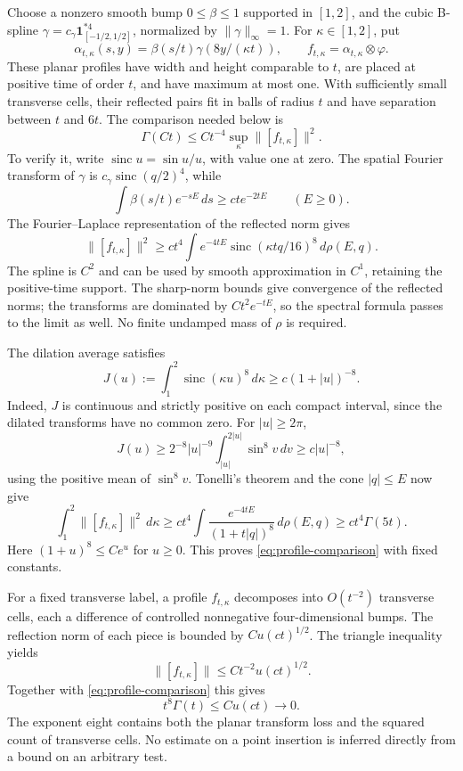 \documentclass[11pt,letterpaper,reqno]{amsart}
\theoremstyle{definition}
\theoremstyle{remark}
\begin{document}
Choose a nonzero smooth bump $0\le\beta\le1$ supported in $[1,2]$,
and the cubic B-spline
$\gamma=c_\gamma\mathbf1_{[-1/2,1/2]}^{*4}$, normalized by
$\|\gamma\|_\infty=1$. For $\kappa\in[1,2]$, put
\[
 \alpha_{t,\kappa}(s,y)=\beta(s/t)\gamma(8y/(\kappa t)),
 \qquad f_{t,\kappa}=\alpha_{t,\kappa}\otimes\varphi.
\]
These planar profiles have width and height comparable to $t$,
are placed at positive time of order $t$, and have maximum at most
one. With sufficiently small transverse cells, their reflected
pairs fit in balls of radius $t$ and have separation between $t$
and $6t$. The comparison needed below is
\begin{equation}\label{eq:profile-comparison}
 \Gamma(Ct)\le Ct^{-4}\sup_\kappa\|[f_{t,\kappa}]\|^2.
\end{equation}
To verify it, write $\operatorname{sinc}u=\sin u/u$, with value one
at zero. The spatial Fourier transform of $\gamma$ is
$c_\gamma\operatorname{sinc}(q/2)^4$, while
\[
 \int\beta(s/t)e^{-sE}\,ds\ge cte^{-2tE}
 \qquad(E\ge0).
\]
The Fourier--Laplace representation of the reflected norm gives
\[
 \|[f_{t,\kappa}]\|^2
 \ge ct^4\int e^{-4tE}
             \operatorname{sinc}(\kappa tq/16)^8\,d\rho(E,q).
\]
The spline is $C^2$ and can be used by smooth approximation in
$C^1$, retaining the positive-time support. The sharp-norm bounds
give convergence of the reflected norms; the transforms are
dominated by $Ct^2e^{-tE}$, so the spectral formula passes to the
limit as well. No finite undamped mass of $\rho$ is required.

The dilation average satisfies
\[
 J(u):=\int_1^2\operatorname{sinc}(\kappa u)^8\,d\kappa
             \ge c(1+|u|)^{-8}.
\]
Indeed, $J$ is continuous and strictly positive on each compact
interval, since the dilated transforms have no common zero. For
$|u|\ge2\pi$,
\[
 J(u)\ge2^{-8}|u|^{-9}
                  \int_{|u|}^{2|u|}\sin^8v\,dv
       \ge c|u|^{-8},
\]
using the positive mean of $\sin^8v$. Tonelli's theorem and the cone
$|q|\le E$ now give
\[
 \int_1^2\|[f_{t,\kappa}]\|^2\,d\kappa
 \ge ct^4\int\frac{e^{-4tE}}{(1+t|q|)^8}\,d\rho(E,q)
 \ge ct^4\Gamma(5t).
\]
Here $(1+u)^8\le Ce^u$ for $u\ge0$. This proves
\eqref{eq:profile-comparison} with fixed constants.

For a fixed transverse label, a profile $f_{t,\kappa}$ decomposes
into $O(t^{-2})$ transverse cells, each a difference of controlled
nonnegative four-dimensional bumps. The reflection norm of each
piece is bounded by $Cu(ct)^{1/2}$. The triangle inequality yields
\[
 \|[f_{t,\kappa}]\|\le Ct^{-2}u(ct)^{1/2}.
\]
Together with \eqref{eq:profile-comparison} this gives
\begin{equation}\label{eq:little-o}
 t^8\Gamma(t)\le Cu(ct)\longrightarrow0.
\end{equation}
The exponent eight contains both the planar transform loss and
the squared count of transverse cells. No estimate on a point
insertion is inferred directly from a bound on an arbitrary test.
\end{document}
